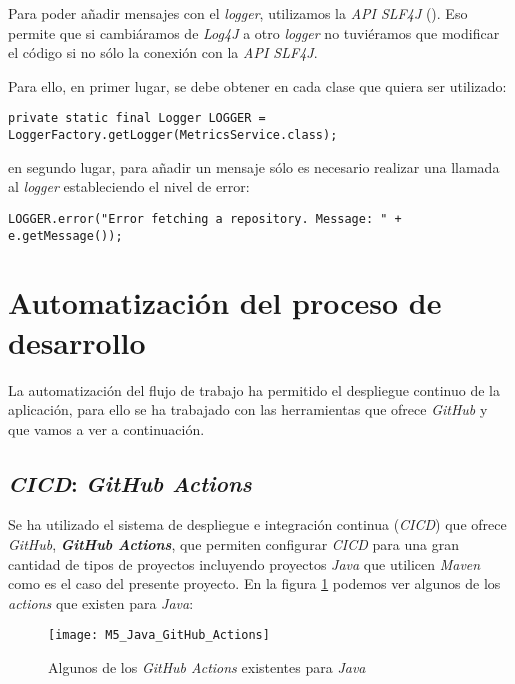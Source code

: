 Para poder añadir mensajes con el \textit{logger}, utilizamos la \textit{API SLF4J} (). Eso permite que si cambiáramos de \textit{Log4J} a otro \textit{logger} no tuviéramos que modificar el código si no sólo la conexión con la \textit{API SLF4J}.

Para ello, en primer lugar, se debe obtener en cada clase que quiera ser utilizado:\\
\begin{minipage}{\linewidth}
{\tiny
\begin{verbatim}
private static final Logger LOGGER = LoggerFactory.getLogger(MetricsService.class);
\end{verbatim}
}
\end{minipage}
en segundo lugar, para añadir un mensaje sólo es necesario realizar una llamada al \textit{logger} estableciendo el nivel de error:\\
\begin{minipage}{\linewidth}
{\tiny
\begin{verbatim}
LOGGER.error("Error fetching a repository. Message: " + e.getMessage());
\end{verbatim}
}
\end{minipage}


\section{Automatización del proceso de desarrollo}

La automatización del flujo de trabajo ha permitido el despliegue continuo de la aplicación, para ello se ha trabajado con las herramientas que ofrece \textit{GitHub} y que vamos a ver a continuación.

\subsection{\textit{CICD}: \textit{GitHub Actions}}

Se ha utilizado el sistema de despliegue e integración continua (\textit{CICD}) que ofrece \textit{GitHub}, \textit{\textbf{GitHub Actions}}, que permiten configurar \textit{CICD} para una gran cantidad de tipos de proyectos incluyendo proyectos \textit{Java} que utilicen \textit{Maven} como es el caso del presente proyecto. En la figura \ref{fig:M5_Java_GitHub_Actions} podemos ver algunos de los \textit{actions} que existen para \textit{Java}:

\begin{figure}[!h]
	\centering
	\texttt{[image: M5\_Java\_GitHub\_Actions]}
	\caption{Algunos de los \textit{GitHub Actions} existentes para \textit{Java}}\label{fig:M5_Java_GitHub_Actions}
\end{figure}
\FloatBarrier


